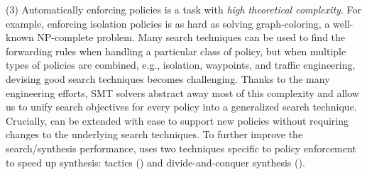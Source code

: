 (3) Automatically enforcing policies is a task with \emph{high
  theoretical complexity}.  For example, enforcing isolation policies
is as hard as solving graph-coloring, a well-known NP-complete
problem.  Many search techniques can be used to find the forwarding
rules when handling a particular class of policy, but when multiple
types of policies are combined, e.g., isolation, waypoints, and
traffic engineering, devising good search techniques becomes
challenging.  Thanks to the many engineering efforts, SMT solvers
abstract away most of this complexity and allow us to unify search
objectives for every policy into a generalized search technique.
Crucially, \Name can be extended with ease to support new policies
without requiring changes to the underlying search techniques. To
further improve the search/synthesis performance, \name uses two techniques
specific to policy enforcement to speed up synthesis: tactics
() and divide-and-conquer synthesis
().


